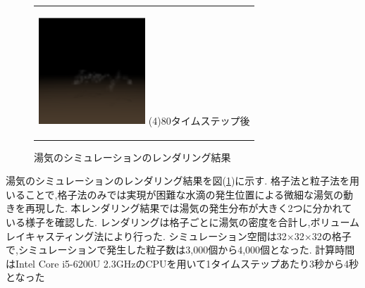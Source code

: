 \begin{figure}[h]
\begin{center}
\begin{tabular}{c}
      \begin{minipage}{0.25\hsize}
        \begin{center}
          \includegraphics[clip, width=4cm]{./render_80.eps}
          \hspace{1.6cm}  (4)80タイムステップ後 
        \end{center}
      \end{minipage}  

    \end{tabular}
    \caption{湯気のシミュレーションのレンダリング結果}
    \label{result}
  \end{center}
\end{figure}


湯気のシミュレーションのレンダリング結果を図(\ref{result})に示す.
格子法と粒子法を用いることで,格子法のみでは実現が困難な水滴の発生位置による微細な湯気の動きを再現した.
本レンダリング結果では湯気の発生分布が大きく2つに分かれている様子を確認した.
レンダリングは格子ごとに湯気の密度を合計し,ボリュームレイキャスティング法により行った.
シミュレーション空間は32×32×32の格子で,シミュレーションで発生した粒子数は3,000個から4,000個となった.
計算時間はIntel Core i5-6200U 2.3GHzのCPUを用いて1タイムステップあたり3秒から4秒となった